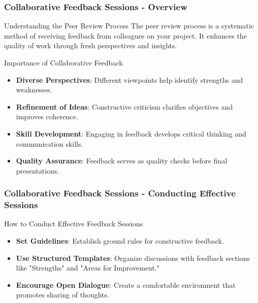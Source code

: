 \documentclass[aspectratio=169]{beamer}
\begin{document}
\begin{frame}[fragile]
    \frametitle{Collaborative Feedback Sessions - Overview}
    \begin{block}{Understanding the Peer Review Process}
        The peer review process is a systematic method of receiving feedback from colleagues on your project. It enhances the quality of work through fresh perspectives and insights.
    \end{block}
    
    \begin{block}{Importance of Collaborative Feedback}
        \begin{itemize}
            \item \textbf{Diverse Perspectives}: Different viewpoints help identify strengths and weaknesses.
            \item \textbf{Refinement of Ideas}: Constructive criticism clarifies objectives and improves coherence.
            \item \textbf{Skill Development}: Engaging in feedback develops critical thinking and communication skills.
            \item \textbf{Quality Assurance}: Feedback serves as quality checks before final presentations.
        \end{itemize}
    \end{block}
\end{frame}

\begin{frame}[fragile]
    \frametitle{Collaborative Feedback Sessions - Conducting Effective Sessions}
    \begin{block}{How to Conduct Effective Feedback Sessions}
        \begin{itemize}
            \item \textbf{Set Guidelines}: Establish ground rules for constructive feedback.
            \item \textbf{Use Structured Templates}: Organize discussions with feedback sections like "Strengths" and "Areas for Improvement."
            \item \textbf{Encourage Open Dialogue}: Create a comfortable environment that promotes sharing of thoughts.
        \end{itemize}
    \end{block}
\end{frame}
\end{document}
